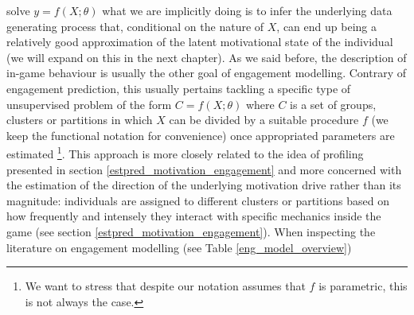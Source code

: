 solve $y = f(X; \theta)$ what we are implicitly doing is to infer the underlying data generating process that, conditional on the nature of $X$, can end up being a relatively good approximation of the latent motivational state of the individual (we will expand on this in the next chapter). As we said before, the description of in-game behaviour is usually the other goal of engagement modelling. Contrary of engagement prediction, this usually pertains tackling a specific type of unsupervised problem of the form $C = f(X; \theta)$ where $C$ is a set of groups, clusters or partitions in which $X$ can be divided by a suitable procedure $f$ (we keep the functional notation for convenience) once appropriated parameters are estimated \cite{bishop2006pattern} \footnote{We want to stress that despite our notation assumes that $f$ is parametric, this is not always the case.}. This approach is more closely related to the idea of profiling presented in section \ref{estpred_motivation_engagement} and more concerned with the estimation of the direction of the underlying motivation drive rather than its magnitude: individuals are assigned to different clusters or partitions based on how frequently and intensely they interact with specific mechanics inside the game (see section \ref{estpred_motivation_engagement}). When inspecting the literature on engagement modelling (see Table \ref{eng_model_overview}) 

